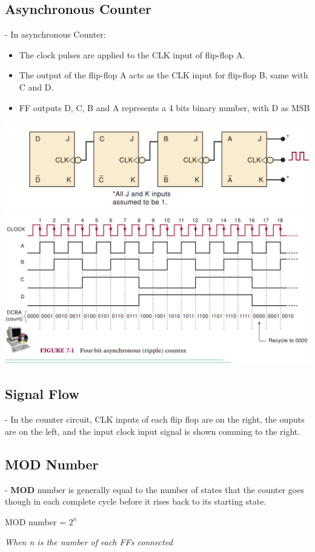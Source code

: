 \documentclass[12pt]{article}
\begin{document}
\subsection{Asynchronous Counter}
- In asynchronous Counter:
\begin{itemize}
	\item The clock pulses are applied to the CLK input of flip-flop A.
	\item The output of the flip-flop A acts as the CLK input for flip-flop B, same with C and D.
	\item FF outputs D, C, B and A represents a 4 bits binary number, with D as MSB
\end{itemize}
\includegraphics[scale = 0.6]{hinh38}
\bigbreak
\includegraphics[scale = 0.6]{hinh39}
\bigbreak
\subsection{Signal Flow}
- In the counter circuit, CLK inputs of each flip flop are on the right, the ouputs are on the left, and the input clock input signal is shown comming to the right. \\
\subsection{MOD Number}
- \textbf{MOD} number is generally equal to the number of states that the counter goes though in each complete cycle before it rises back to its starting state. \\
\begin{center}
MOD number = $2^{n}$
\end{center}
\textit{When n is the number of each FFs connected}
\end{document}
